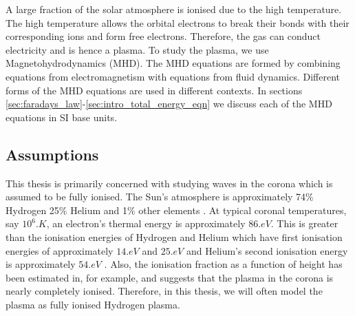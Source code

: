 A large fraction of the solar atmosphere is ionised \citep{Shimizu2018} due to the high temperature. The high temperature allows the orbital electrons to break their bonds with their corresponding ions and form free electrons. Therefore, the gas can conduct electricity and is hence a plasma. To study the plasma, we use Magnetohydrodynamics (MHD). The MHD equations are formed by combining equations from electromagnetism with equations from fluid dynamics. Different forms of the MHD equations are used in different contexts. In sections \ref{sec:faradays_law}-\ref{sec:intro_total_energy_eqn} we discuss each of the MHD equations in SI base units.


\subsection{Assumptions}
\label{sec:intro_assumptions}

This thesis is primarily concerned with studying waves in the corona which is assumed to be fully ionised. The Sun's atmosphere is approximately 74\% Hydrogen 25\% Helium and 1\% other elements \citep{sun_vital_statistics}. At typical coronal temperatures, say $10^6\si{.K}$, an electron's thermal energy is approximately $86\si{.eV}$. This is greater than the ionisation energies of Hydrogen and Helium which have first ionisation energies of approximately $14\si{.eV}$ and $25\si{.eV}$ and Helium's second ionisation energy is approximately $54\si{.eV}$ \citep{Lide2003}. Also, the ionisation fraction as a function of height has been estimated in, for example, \citet{Shimizu2018} and suggests that the plasma in the corona is nearly completely ionised. Therefore, in this thesis, we will often model the plasma as fully ionised Hydrogen plasma.

